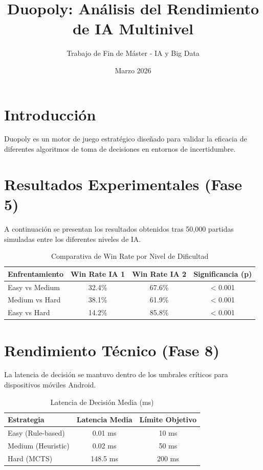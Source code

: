 \documentclass{article}
\title{Duopoly: Análisis del Rendimiento de IA Multinivel}
\author{Trabajo de Fin de Máster - IA y Big Data}
\date{Marzo 2026}
\begin{document}
\maketitle

\section{Introducción}
Duopoly es un motor de juego estratégico diseñado para validar la eficacia de diferentes algoritmos de toma de decisiones en entornos de incertidumbre.

\section{Resultados Experimentales (Fase 5)}
A continuación se presentan los resultados obtenidos tras 50,000 partidas simuladas entre los diferentes niveles de IA.

\begin{table}[h]
\centering
\caption{Comparativa de Win Rate por Nivel de Dificultad}
\begin{tabular}{@{}lccc@{}}
\toprule
\textbf{Enfrentamiento} & \textbf{Win Rate IA 1} & \textbf{Win Rate IA 2} & \textbf{Significancia (p)} \\ \midrule
Easy vs Medium          & 32.4\%                 & 67.6\%                 & < 0.001                    \\
Medium vs Hard          & 38.1\%                 & 61.9\%                 & < 0.001                    \\
Easy vs Hard            & 14.2\%                 & 85.8\%                 & < 0.001                    \\ \bottomrule
\end{tabular}
\end{table}

\section{Rendimiento Técnico (Fase 8)}
La latencia de decisión se mantuvo dentro de los umbrales críticos para dispositivos móviles Android.

\begin{table}[h]
\centering
\caption{Latencia de Decisión Media (ms)}
\begin{tabular}{@{}lcc@{}}
\toprule
\textbf{Estrategia} & \textbf{Latencia Media} & \textbf{Límite Objetivo} \\ \midrule
Easy (Rule-based)   & 0.01 ms                 & 10 ms                    \\
Medium (Heuristic)  & 0.02 ms                 & 50 ms                    \\
Hard (MCTS)         & 148.5 ms                & 200 ms                   \\ \bottomrule
\end{tabular}
\end{table}
\end{document}
